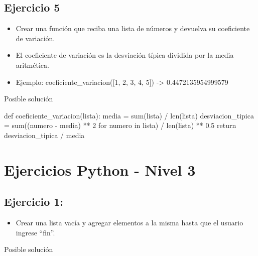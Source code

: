 \documentclass[
  a4paper,
  DIV=11,
  numbers=noendperiod,
  onepage,
  openany]{scrreprt}
\newenvironment{Shaded}{\begin{snugshade}}{\end{snugshade}}
\newcommand{\BuiltInTok}[1]{\textcolor[rgb]{0.00,0.23,0.31}{#1}}
\newcommand{\ControlFlowTok}[1]{\textcolor[rgb]{0.00,0.23,0.31}{#1}}
\newcommand{\DecValTok}[1]{\textcolor[rgb]{0.68,0.00,0.00}{#1}}
\newcommand{\FloatTok}[1]{\textcolor[rgb]{0.68,0.00,0.00}{#1}}
\newcommand{\KeywordTok}[1]{\textcolor[rgb]{0.00,0.23,0.31}{#1}}
\newcommand{\NormalTok}[1]{\textcolor[rgb]{0.00,0.23,0.31}{#1}}
\newcommand{\OperatorTok}[1]{\textcolor[rgb]{0.37,0.37,0.37}{#1}}
\providecommand{\tightlist}{%
  \setlength{\itemsep}{0pt}\setlength{\parskip}{0pt}}\usepackage{longtable,booktabs,array}
\begin{document}
\section{Ejercicio 5}\label{ejercicio-5-2}

\begin{itemize}
\tightlist
\item
  Crear una función que reciba una lista de números y devuelva su
  coeficiente de variación.
\item
  El coeficiente de variación es la desviación típica dividida por la
  media aritmética.
\item
  Ejemplo: coeficiente\_variacion({[}1, 2, 3, 4, 5{]}) -\textgreater{}
  0.4472135954999579
\end{itemize}

Posible solución

\begin{Shaded}
\begin{Highlighting}[]
\KeywordTok{def}\NormalTok{ coeficiente\_variacion(lista):}
\NormalTok{    media }\OperatorTok{=} \BuiltInTok{sum}\NormalTok{(lista) }\OperatorTok{/} \BuiltInTok{len}\NormalTok{(lista)}
\NormalTok{    desviacion\_tipica }\OperatorTok{=} \BuiltInTok{sum}\NormalTok{((numero }\OperatorTok{{-}}\NormalTok{ media) }\OperatorTok{**} \DecValTok{2} \ControlFlowTok{for}\NormalTok{ numero }\KeywordTok{in}\NormalTok{ lista) }\OperatorTok{/} \BuiltInTok{len}\NormalTok{(lista) }\OperatorTok{**} \FloatTok{0.5}
    \ControlFlowTok{return}\NormalTok{ desviacion\_tipica }\OperatorTok{/}\NormalTok{ media}
\end{Highlighting}
\end{Shaded}

\chapter{Ejercicios Python - Nivel 3}\label{ejercicios-python---nivel-3}

\section{Ejercicio 1:}\label{ejercicio-1-4}

\begin{itemize}
\tightlist
\item
  Crear una lista vacía y agregar elementos a la misma hasta que el
  usuario ingrese ``fin''.
\end{itemize}

Posible solución
\end{document}
